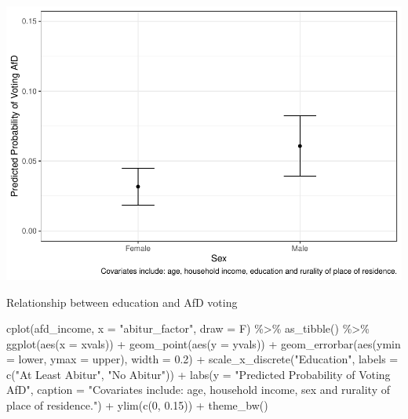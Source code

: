 \documentclass[
]{article}
\newenvironment{Shaded}{\begin{snugshade}}{\end{snugshade}}
\newcommand{\AttributeTok}[1]{\textcolor[rgb]{0.77,0.63,0.00}{#1}}
\newcommand{\DecValTok}[1]{\textcolor[rgb]{0.00,0.00,0.81}{#1}}
\newcommand{\FloatTok}[1]{\textcolor[rgb]{0.00,0.00,0.81}{#1}}
\newcommand{\FunctionTok}[1]{\textcolor[rgb]{0.00,0.00,0.00}{#1}}
\newcommand{\NormalTok}[1]{#1}
\newcommand{\SpecialCharTok}[1]{\textcolor[rgb]{0.00,0.00,0.00}{#1}}
\newcommand{\StringTok}[1]{\textcolor[rgb]{0.31,0.60,0.02}{#1}}
\begin{document}
\includegraphics{AVCD_Final_Assignment-Edenhofer_files/figure-latex/afd-sex-1.pdf}

Relationship between education and AfD voting

\begin{Shaded}
\begin{Highlighting}[]
\FunctionTok{cplot}\NormalTok{(afd\_income, }\AttributeTok{x =} \StringTok{"abitur\_factor"}\NormalTok{, }\AttributeTok{draw =}\NormalTok{ F) }\SpecialCharTok{\%\textgreater{}\%}
  \FunctionTok{as\_tibble}\NormalTok{() }\SpecialCharTok{\%\textgreater{}\%}
  \FunctionTok{ggplot}\NormalTok{(}\FunctionTok{aes}\NormalTok{(}\AttributeTok{x =}\NormalTok{ xvals)) }\SpecialCharTok{+}
  \FunctionTok{geom\_point}\NormalTok{(}\FunctionTok{aes}\NormalTok{(}\AttributeTok{y =}\NormalTok{ yvals)) }\SpecialCharTok{+}
  \FunctionTok{geom\_errorbar}\NormalTok{(}\FunctionTok{aes}\NormalTok{(}\AttributeTok{ymin =}\NormalTok{ lower, }\AttributeTok{ymax =}\NormalTok{ upper), }\AttributeTok{width =} \FloatTok{0.2}\NormalTok{) }\SpecialCharTok{+}
  \FunctionTok{scale\_x\_discrete}\NormalTok{(}\StringTok{"Education"}\NormalTok{, }\AttributeTok{labels =} \FunctionTok{c}\NormalTok{(}\StringTok{"At Least Abitur"}\NormalTok{, }
                                           \StringTok{"No Abitur"}\NormalTok{)) }\SpecialCharTok{+}
  \FunctionTok{labs}\NormalTok{(}\AttributeTok{y =} \StringTok{"Predicted Probability of Voting AfD"}\NormalTok{, }
       \AttributeTok{caption =} \StringTok{"Covariates include: age, household income, sex and rurality of place of residence."}\NormalTok{) }\SpecialCharTok{+}
  \FunctionTok{ylim}\NormalTok{(}\FunctionTok{c}\NormalTok{(}\DecValTok{0}\NormalTok{, }\FloatTok{0.15}\NormalTok{)) }\SpecialCharTok{+}
  \FunctionTok{theme\_bw}\NormalTok{()}
\end{Highlighting}
\end{Shaded}
\end{document}
